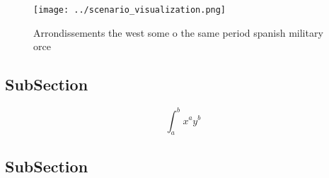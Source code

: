 \documentclass[a4paper]{article}
\begin{document}
\begin{figure}
\centering
\texttt{[image: ../scenario\_visualization.png]}
\caption{Arrondissements the west some o the same period spanish military orce
}
\end{figure}
 
\subsection{SubSection}

\[ \int_{a}^{b}{x^{a}y^{b}} \]

\subsection{SubSection}
\end{document}
